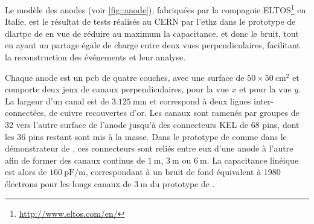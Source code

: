             
      Le modèle des anodes (voir \autoref{fig::anode}), fabriquées par la compagnie ELTOS\footnote{\url{http://www.eltos.com/en/}} en Italie, est le résultat de tests réalisés au CERN par l'\gls{ethz} dans le prototype de \gls{dlartpc} de \threeL{}\cite{Cantini2013} en vue de réduire au maximum la capacitance, et donc le bruit, tout en ayant un partage égale de charge entre deux vues perpendiculaires, facilitant la reconstruction des événements et leur analyse.
            
      Chaque anode est un \gls{pcb} de quatre couches, avec une surface de  $50\times\SI{50}{\centi\meter\squared}$ et comporte deux jeux de canaux perpendiculaires,  pour la vue $x$ et  pour la vue $y$. La largeur d'un canal est de $\SI{3.125}{\milli\meter}$ et correspond à deux lignes inter-connectées, de cuivre recouvertes d'or. Les canaux sont ramenés par groupes de 32 vers l'autre surface de l'anode jusqu'à des connecteurs KEL de 68 pins, dont les 36 pins restant sont mis à la masse. Dans le prototype de \TOO{} comme dans le démonstrateur de \SSS{}, ces connecteurs sont reliés entre eux d'une anode à l'autre afin de former des canaux continus de $\SI{1}{\meter}$, $\SI{3}{\meter}$ ou $\SI{6}{\meter}$. La capacitance linéique est alors de $\SI{160}{\pico\farad\per\meter}$, correspondant à un bruit de fond équivalent à 1980 électrons\cite{Aimard2018} pour les longs canaux de $\SI{3}{\meter}$ du prototype de \TOO{}.
            
